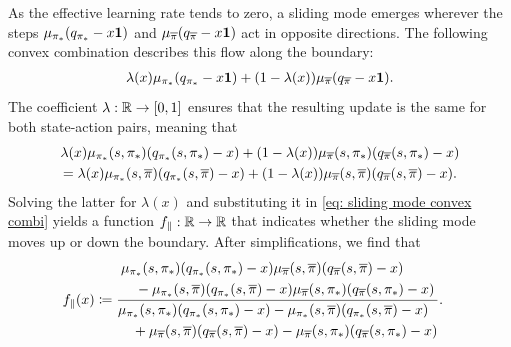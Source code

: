 As the effective learning rate tends to zero, a sliding mode emerges wherever the steps $\mu_{{\pi}_*}(q_{{\pi}_*} - x \mathbf{1})$ and $\mu_{\overline{\pi}}(q_{\overline{\pi}} - x \mathbf{1})$ act in opposite directions.
The following convex combination describes this flow along the boundary:
\begin{align}
\label{eq: sliding mode convex combi}
    \lambda(x) \mu_{{\pi}_*}(q_{{\pi}_*} - x \mathbf{1}) 
    + (1-\lambda(x)) \mu_{\overline{\pi}}(q_{\overline{\pi}} - x \mathbf{1}) .
\end{align}
The coefficient $\lambda : \mathbb{R} \to [0,1]$ ensures that the resulting update is the same for both state-action pairs, meaning that
\begin{multline*}
    \lambda(x) \mu_{{\pi}_*}(s, {\pi}_*)(q_{{\pi}_*}(s, {\pi}_*) - x) 
    + (1-\lambda(x)) \mu_{\overline{\pi}}(s, {\pi}_*)(q_{\overline{\pi}}(s, {\pi}_*) - x)
    \\
    = 
    \lambda(x) \mu_{{\pi}_*}(s, \overline{\pi})(q_{{\pi}_*}(s, \overline{\pi}) - x) 
    + (1-\lambda(x)) \mu_{\overline{\pi}}(s, \overline{\pi})(q_{\overline{\pi}}(s, \overline{\pi}) - x) .
\end{multline*}
Solving the latter for $\lambda(x)$ and substituting it in \eqref{eq: sliding mode convex combi} yields a function $f_\parallel : \mathbb{R} \to \mathbb{R}$ that indicates whether the sliding mode moves up or down the boundary.
After simplifications, we find that
\begin{align}
\label{eq: f para}
    f_\parallel(x)
    &\coloneqq \frac{
    \begin{aligned}
        &\mu_{{\pi}_*}(s, {\pi}_*)(q_{{\pi}_*}(s, {\pi}_*) - x)
        \mu_{\overline{\pi}}(s, \overline{\pi})(q_{\overline{\pi}}(s, \overline{\pi}) - x)
        \\
        &\quad - \mu_{{\pi}_*}(s, \overline{\pi})(q_{{\pi}_*}(s, \overline{\pi}) - x)
        \mu_{\overline{\pi}}(s, {\pi}_*)(q_{\overline{\pi}}(s, {\pi}_*) - x)
    \end{aligned}}
    {\begin{aligned}
        &\mu_{{\pi}_*}(s, {\pi}_*)(q_{{\pi}_*}(s, {\pi}_*) - x) - \mu_{{\pi}_*}(s, \overline{\pi})(q_{{\pi}_*}(s, \overline{\pi}) - x) 
        \\
        &\quad + \mu_{\overline{\pi}}(s, \overline{\pi})(q_{\overline{\pi}}(s, \overline{\pi}) - x) - \mu_{\overline{\pi}}(s, {\pi}_*)(q_{\overline{\pi}}(s, {\pi}_*) - x) 
    \end{aligned}}
    .
\end{align}
